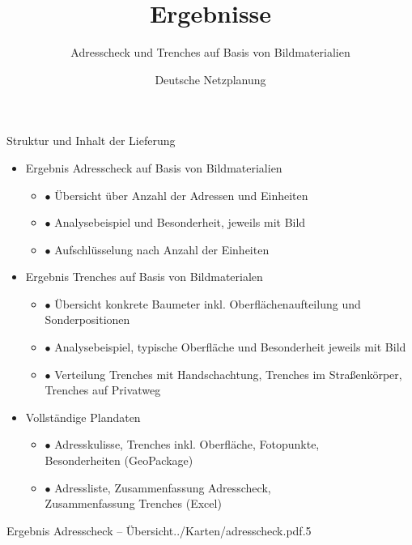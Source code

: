 \documentclass[11pt, dvipsnames,aspectratio=169]{beamer}
\author[DNP]{Deutsche Netzplanung}
\title[Ergebnisse \Ort]{\textbf{Ergebnisse} \\ \Ort}
\subtitle{Adresscheck und Trenches auf Basis von Bildmaterialien}
\date{\Abgabedatum}
\newenvironment{bulletlist}[1]{\begin{itemize}\setlength{\itemsep}{#1}}{\end{itemize}}
\begin{document}
	
{
\maketitle
}

\begin{frame}{Struktur und Inhalt der Lieferung \Ort}
	\begin{bulletlist}{5pt}
		\item Ergebnis Adresscheck auf Basis von Bildmaterialien
			\begin{bulletlist}{3pt}
				\item[$\bullet$] Übersicht über Anzahl der Adressen und Einheiten
				\item[$\bullet$] Analysebeispiel und Besonderheit, jeweils mit Bild
				\item[$\bullet$] Aufschlüsselung nach Anzahl der Einheiten
			\end{bulletlist}
		\item Ergebnis Trenches auf Basis von Bildmaterialen
		\begin{bulletlist}{3pt}
			\item[$\bullet$] Übersicht konkrete Baumeter inkl. Oberflächenaufteilung und Sonderpositionen
			\item[$\bullet$] Analysebeispiel, typische Oberfläche und Besonderheit jeweils mit Bild
			\item[$\bullet$] Verteilung Trenches mit Handschachtung, Trenches im Straßenkörper, \\ Trenches auf Privatweg
		\end{bulletlist}
		\item Vollständige Plandaten
		\begin{bulletlist}{3pt}
			\item[$\bullet$] Adresskulisse, Trenches inkl. Oberfläche, Fotopunkte, \\ Besonderheiten (GeoPackage)
			\item[$\bullet$] Adressliste, Zusammenfassung Adresscheck, \\ Zusammenfassung Trenches (Excel)
		\end{bulletlist}
	\end{bulletlist}
\end{frame}

\begin{mapframe}{Ergebnis Adresscheck -- Übersicht}{../Karten/adresscheck.pdf}{.5\linewidth}
	\centering
	\resizebox{\textwidth}{!}{\adressStatistik}
\end{mapframe}
\end{document}
